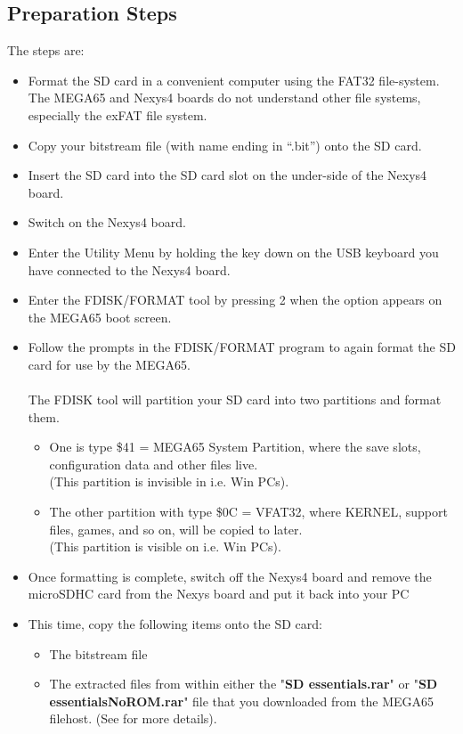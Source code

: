 \subsection{Preparation Steps}

The steps are:

\begin{itemize}
  \item{Format the SD card} in a convenient computer using the FAT32 file-system.  The MEGA65 and Nexys4 boards do not understand other
file systems, especially the exFAT file system.
\item{Copy} your bitstream file (with name ending in ``.bit'') onto the SD card.
\item{Insert} the SD card into the SD card slot on the under-side of the Nexys4 board.
\item{Switch on} the Nexys4 board.
\item{Enter the Utility Menu} by holding the  key down on the USB keyboard you have connected to the Nexys4 board.
\item{Enter the FDISK/FORMAT tool} by pressing 2 when the option appears on the MEGA65 boot screen.
\item{Follow the prompts} in the FDISK/FORMAT program to again format the SD card for use by the MEGA65. \\
  \\
  The FDISK tool will partition your SD card into two partitions and format them.
  \begin{itemize}
    \item One is type \$41 = MEGA65 System Partition, where the save slots, configuration data and other files live. \\
  (This partition is invisible in i.e. Win PCs).
    \item The other partition with type \$0C = VFAT32, where KERNEL, support files, games, and so on, will be copied to later. \\
  (This partition is visible on i.e. Win PCs).
  \end{itemize}
\item{Once formatting is complete}, switch off the Nexys4 board and remove the microSDHC card from the Nexys board and put it back into your PC
\item{This time, copy} the following items onto the SD card:
  \begin{itemize}
    \item The bitstream file
    \item The extracted files from within either the "\textbf{SD essentials.rar}" or "\textbf{SD essentialsNoROM.rar}" file that you downloaded from the MEGA65 filehost. (See  for more details).

\end{itemize}
\end{itemize}
